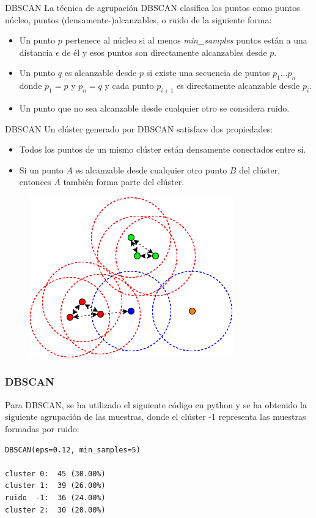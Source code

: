 \documentclass[spanish]{beamer}
\begin{document}
\begin{frame}{DBSCAN}
La técnica de agrupación DBSCAN clasifica los puntos como puntos núcleo, puntos (densamente-)alcanzables, o ruido de la siguiente forma:

\begin{itemize}
\item Un punto $p$ pertenece al núcleo si al menos \textit{min\_samples} puntos están a una distancia $\epsilon$ de él y esos puntos son directamente alcanzables desde $p$.
\item Un punto $q$ es alcanzable desde $p$ si existe una secuencia de puntos $p_1\dots p_n$ donde $p_1=p$ y $p_n=q$ y cada punto $p_{i+1}$ es directamente alcanzable desde $p_i$.
\item Un punto que no sea alcanzable desde cualquier otro se considera ruido.
\end{itemize}
\end{frame}

\begin{frame}{DBSCAN}
Un clúster generado por DBSCAN satisface dos propiedades:

\begin{itemize}
\item Todos los puntos de un mismo clúster están densamente conectados entre sí.
\item Si un punto $A$ es alcanzable desde cualquier otro punto $B$ del clúster, entonces $A$ también forma parte del clúster.
\end{itemize}
\begin{figure}[h]
\centering
\includegraphics[scale=0.37]{dani/DBSCAN2.png}
\end{figure}
\end{frame}

\begin{frame}[fragile]
\frametitle{DBSCAN}
Para DBSCAN, se ha utilizado el siguiente código en python y se ha obtenido la siguiente agrupación de las muestras, donde el clúster -1 representa las muestras formadas por ruido:\break
\begin{lstlisting}
DBSCAN(eps=0.12, min_samples=5)

cluster 0:  45 (30.00%)
cluster 1:  39 (26.00%)
ruido  -1:  36 (24.00%)
cluster 2:  30 (20.00%)
\end{lstlisting}
\end{frame}
\end{document}
